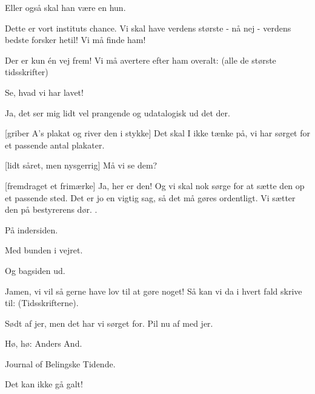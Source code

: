 \documentclass[a4paper,11pt]{article}
\begin{document}
\begin{sketch}
   Eller også skal han være en hun.

   Dette er vort instituts chance.  Vi skal have verdens største - nå nej - verdens bedste forsker hetil!  Vi må finde ham!

   Der er kun én vej frem!  Vi må avertere efter ham overalt: (alle de største tidsskrifter)


   Se, hvad vi har lavet!

   Ja, det ser mig lidt vel prangende og udatalogisk ud det
  der.

  [griber A's plakat og river den i stykke] Det skal I ikke
  tænke på, vi har sørget for et passende antal plakater.

  [lidt såret, men nysgerrig] Må vi se dem?

  [fremdraget et frimærke] Ja, her er den!  Og vi skal nok
  sørge for at sætte den op et passende sted.  Det er jo en vigtig sag,
  så det må gøres ordentligt.  Vi sætter den på bestyrerens dør. .

   På indersiden.

   Med bunden i vejret.

   Og bagsiden ud.

   Jamen, vi vil så gerne have lov til at gøre noget!  Så kan
  vi da i hvert fald skrive til: (Tidsskrifterne).

   Sødt af jer, men det har vi sørget for.  Pil nu af med jer.


   Hø, hø: Anders And.

   Journal of Belingske Tidende.

   Det kan ikke gå galt!

\end{sketch}
\end{document}
